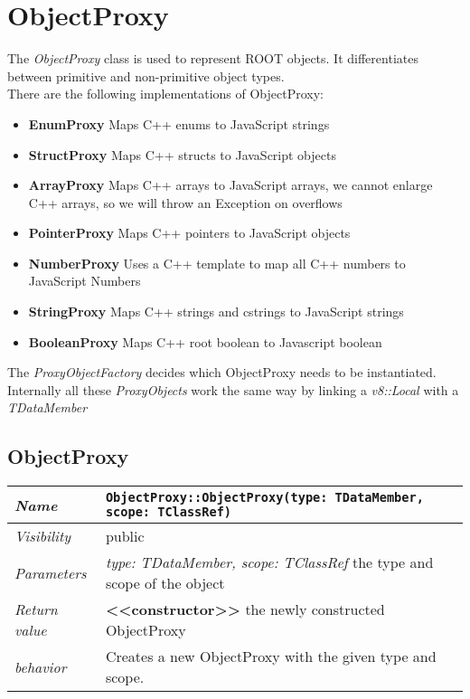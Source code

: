 \chapter{ObjectProxy}
The \textit{ObjectProxy} class is used to represent ROOT objects. It differentiates between primitive and non-primitive object types.\\
There are the following implementations of ObjectProxy:
\begin{itemize}
\item \textbf{EnumProxy} Maps C++ enums to JavaScript strings
\item \textbf{StructProxy} Maps C++ structs to JavaScript objects
\item \textbf{ArrayProxy} Maps C++ arrays to JavaScript arrays, we cannot enlarge C++ arrays, so we will throw an Exception on overflows
\item \textbf{PointerProxy} Maps C++ pointers to JavaScript objects
\item \textbf{NumberProxy} Uses a C++ template to map all C++ numbers to JavaScript Numbers
\item \textbf{StringProxy} Maps C++ strings and cstrings to JavaScript strings
\item \textbf{BooleanProxy} Maps C++ root boolean to Javascript boolean
\end{itemize}
The \textit{ProxyObjectFactory} decides which ObjectProxy needs to be instantiated.
Internally all these \textit{ProxyObjects} work the same way by linking a \textit{v8::Local} with a \textit{TDataMember}
\section{ObjectProxy}
\begin{longtable}{p{3cm} @{\hskip 1cm} p{12cm}}
 \hline
\textit{Name} & \texttt{ObjectProxy::ObjectProxy(type: TDataMember, scope: TClassRef)}\\
\hline
 \textit{Visibility} & public\\
\hline
\textit{Parameters} & \textit{type: TDataMember, scope: TClassRef} the type and scope of the object\\
\hline
\textit{Return value} & \textbf{<<constructor>>} the newly constructed ObjectProxy\\
  \hline
  \textit{behavior} & Creates a new ObjectProxy with the given type and scope.\\
\hline
\end{longtable} \pagebreak

